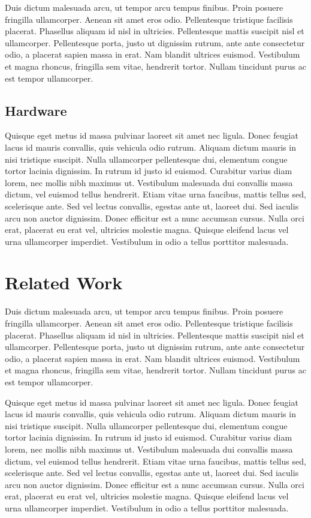 \documentclass[conference]{IEEEtran}
\begin{document}
Duis dictum malesuada arcu, ut tempor arcu tempus finibus. Proin posuere fringilla ullamcorper. Aenean sit amet eros odio. Pellentesque tristique facilisis placerat. Phasellus aliquam id nisl in ultricies. Pellentesque mattis suscipit nisl et ullamcorper. Pellentesque porta, justo ut dignissim rutrum, ante ante consectetur odio, a placerat sapien massa in erat. Nam blandit ultrices euismod. Vestibulum et magna rhoncus, fringilla sem vitae, hendrerit tortor. Nullam tincidunt purus ac est tempor ullamcorper.

\subsection{Hardware}

Quisque eget metus id massa pulvinar laoreet sit amet nec ligula. Donec feugiat lacus id mauris convallis, quis vehicula odio rutrum. Aliquam dictum mauris in nisi tristique suscipit. Nulla ullamcorper pellentesque dui, elementum congue tortor lacinia dignissim. In rutrum id justo id euismod. Curabitur varius diam lorem, nec mollis nibh maximus ut. Vestibulum malesuada dui convallis massa dictum, vel euismod tellus hendrerit. Etiam vitae urna faucibus, mattis tellus sed, scelerisque ante. Sed vel lectus convallis, egestas ante ut, laoreet dui. Sed iaculis arcu non auctor dignissim. Donec efficitur est a nunc accumsan cursus. Nulla orci erat, placerat eu erat vel, ultricies molestie magna. Quisque eleifend lacus vel urna ullamcorper imperdiet. Vestibulum in odio a tellus porttitor malesuada.

\section{Related Work}

Duis dictum malesuada arcu, ut tempor arcu tempus finibus. Proin posuere fringilla ullamcorper. Aenean sit amet eros odio. Pellentesque tristique facilisis placerat. Phasellus aliquam id nisl in ultricies. Pellentesque mattis suscipit nisl et ullamcorper. Pellentesque porta, justo ut dignissim rutrum, ante ante consectetur odio, a placerat sapien massa in erat. Nam blandit ultrices euismod. Vestibulum et magna rhoncus, fringilla sem vitae, hendrerit tortor. Nullam tincidunt purus ac est tempor ullamcorper.

Quisque eget metus id massa pulvinar laoreet sit amet nec ligula. Donec feugiat lacus id mauris convallis, quis vehicula odio rutrum. Aliquam dictum mauris in nisi tristique suscipit. Nulla ullamcorper pellentesque dui, elementum congue tortor lacinia dignissim. In rutrum id justo id euismod. Curabitur varius diam lorem, nec mollis nibh maximus ut. Vestibulum malesuada dui convallis massa dictum, vel euismod tellus hendrerit. Etiam vitae urna faucibus, mattis tellus sed, scelerisque ante. Sed vel lectus convallis, egestas ante ut, laoreet dui. Sed iaculis arcu non auctor dignissim. Donec efficitur est a nunc accumsan cursus. Nulla orci erat, placerat eu erat vel, ultricies molestie magna. Quisque eleifend lacus vel urna ullamcorper imperdiet. Vestibulum in odio a tellus porttitor malesuada.
\end{document}
